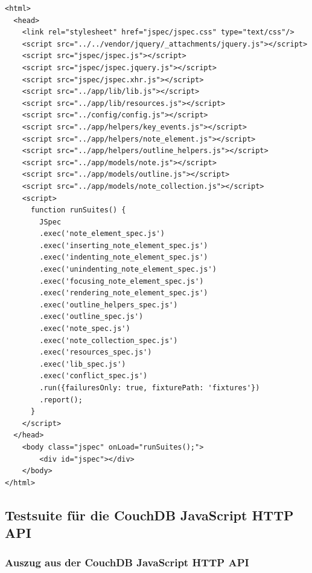 \lstset{language=html}
\medskip 
\begin{lstlisting}[label=code:jspec-index,caption={\fontfamily{pcr}\selectfont /\_attachments/spec/index.html}]
<html>
  <head>
    <link rel="stylesheet" href="jspec/jspec.css" type="text/css"/>
    <script src="../../vendor/jquery/_attachments/jquery.js"></script>
    <script src="jspec/jspec.js"></script>
    <script src="jspec/jspec.jquery.js"></script>
    <script src="jspec/jspec.xhr.js"></script>
    <script src="../app/lib/lib.js"></script>
    <script src="../app/lib/resources.js"></script>
    <script src="../config/config.js"></script>
    <script src="../app/helpers/key_events.js"></script>
    <script src="../app/helpers/note_element.js"></script>
    <script src="../app/helpers/outline_helpers.js"></script>
    <script src="../app/models/note.js"></script>
    <script src="../app/models/outline.js"></script>
    <script src="../app/models/note_collection.js"></script>
    <script>
      function runSuites() {
        JSpec
        .exec('note_element_spec.js')
        .exec('inserting_note_element_spec.js')
        .exec('indenting_note_element_spec.js')
        .exec('unindenting_note_element_spec.js')
        .exec('focusing_note_element_spec.js')
        .exec('rendering_note_element_spec.js')
        .exec('outline_helpers_spec.js')
        .exec('outline_spec.js')
        .exec('note_spec.js')
        .exec('note_collection_spec.js')
        .exec('resources_spec.js')
        .exec('lib_spec.js')
        .exec('conflict_spec.js')
        .run({failuresOnly: true, fixturePath: 'fixtures'})
        .report();
      }
    </script>
  </head>
	<body class="jspec" onLoad="runSuites();">
		<div id="jspec"></div>
	</body>
</html>
\end{lstlisting}










\subsection{Testsuite für die CouchDB JavaScript HTTP API}
\label{subsec:httpapi}

\subsubsection{Auszug aus der CouchDB JavaScript HTTP API}

